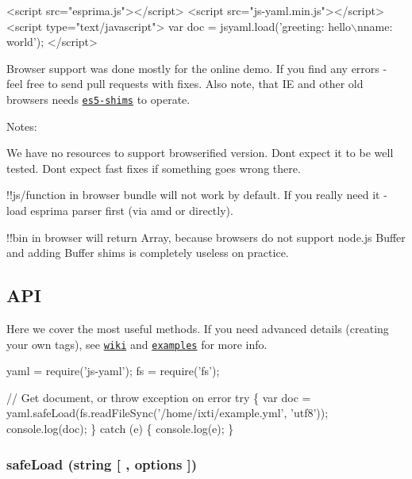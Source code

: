 \begin{DoxyCode}
<script src="esprima.js"></script>
<script src="js-yaml.min.js"></script>
<script type="text/javascript">
var doc = jsyaml.load('greeting: hello\(\backslash\)nname: world');
</script>
\end{DoxyCode}


Browser support was done mostly for the online demo. If you find any errors -\/ feel free to send pull requests with fixes. Also note, that IE and other old browsers needs \href{https://github.com/kriskowal/es5-shim}{\tt es5-\/shims} to operate.

Notes\+:


\begin{DoxyEnumerate}
\item We have no resources to support browserified version. Don\textquotesingle{}t expect it to be well tested. Don\textquotesingle{}t expect fast fixes if something goes wrong there.
\item {\ttfamily !!js/function} in browser bundle will not work by default. If you really need it -\/ load {\ttfamily esprima} parser first (via amd or directly).
\item {\ttfamily !!bin} in browser will return {\ttfamily Array}, because browsers do not support node.\+js {\ttfamily Buffer} and adding Buffer shims is completely useless on practice.
\end{DoxyEnumerate}

\subsection*{A\+PI }

Here we cover the most \textquotesingle{}useful\textquotesingle{} methods. If you need advanced details (creating your own tags), see \href{https://github.com/nodeca/js-yaml/wiki}{\tt wiki} and \href{https://github.com/nodeca/js-yaml/tree/master/examples}{\tt examples} for more info.


\begin{DoxyCode}
yaml = require('js-yaml');
fs   = require('fs');

// Get document, or throw exception on error
try \{
  var doc = yaml.safeLoad(fs.readFileSync('/home/ixti/example.yml', 'utf8'));
  console.log(doc);
\} catch (e) \{
  console.log(e);
\}
\end{DoxyCode}


\subsubsection*{safe\+Load (string \mbox{[} , options \mbox{]})}

